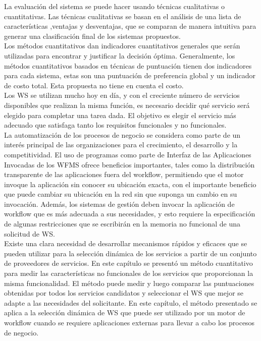 La evaluación del sistema se puede hacer usando técnicas cualitativas o cuantitativas. Las técnicas cualitativas se basan en el análisis de una lista de características ,ventajas y desventajas, que se comparan de manera intuitiva para generar una clasificación final de los sistemas propuestos.\\
 
Los métodos cuantitativos dan indicadores cuantitativos generales que serán utilizadas para encontrar y justificar la decisión óptima.
Generalmente, los métodos cuantitativos basados en técnicas de puntuación tienen dos indicadores para cada sistema, estas son una puntuación de preferencia global y un indicador de costo total. Esta propuesta no tiene en cuenta el costo.\\
Los WS se utilizan mucho hoy en día, y con el creciente número de servicios disponibles que realizan la misma función, es necesario decidir qué servicio será elegido para completar una tarea dada. El objetivo es elegir el servicio más adecuado que satisfaga tanto los requisitos funcionales y no funcionales.\\
La automatización de los procesos de negocio se considera como parte de un interés principal de las organizaciones para el crecimiento, el desarrollo y la competitividad. El uso de programas como parte de Interfaz de las Aplicaciones Invocadas de los WFMS ofrece beneficios importantes, tales como la distribución transparente de las aplicaciones fuera del workflow, permitiendo que el motor invoque la aplicación sin conocer su ubicación exacta, con el importante beneficio que puede cambiar su ubicación en la red sin que suponga un cambio en su invocación. Además, los sistemas de gestión deben invocar la aplicación de workflow que es más adecuada a sus necesidades, y esto requiere la especificación de algunas restricciones que se escribirán en la memoria no funcional de una solicitud de WS.\\
Existe una clara necesidad de desarrollar mecanismos rápidos y eficaces que se pueden utilizar para la selección dinámica de los servicios a partir de un conjunto de proveedores de servicios. En este capítulo se presentó un método cuantitativo para medir las características no funcionales de los servicios que proporcionan la misma funcionalidad. El método puede medir y luego comparar las puntuaciones obtenidas por todos los servicios candidatos y seleccionar el WS que mejor se adapte a las necesidades del solicitante. En este capítulo, el método presentado se aplica a la selección dinámica de WS que puede ser utilizado por un motor de workflow cuando se requiere aplicaciones externas para llevar a cabo los procesos de negocio. 
